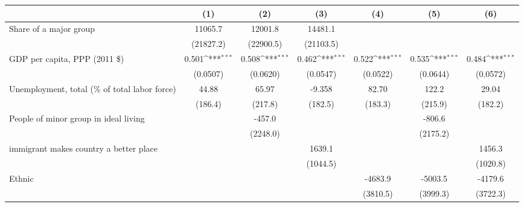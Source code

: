 {
\def\sym#1{\ifmmode^{#1}\else\(^{#1}\)\fi}
\begin{tabular}{l*{6}{c}}
\hline\hline
                    &\multicolumn{1}{c}{(1)}&\multicolumn{1}{c}{(2)}&\multicolumn{1}{c}{(3)}&\multicolumn{1}{c}{(4)}&\multicolumn{1}{c}{(5)}&\multicolumn{1}{c}{(6)}\\
\hline
Share of a major group&     11065.7         &     12001.8         &     14481.1         &                     &                     &                     \\
                    &   (21827.2)         &   (22900.5)         &   (21103.5)         &                     &                     &                     \\
[1em]
GDP per capita, PPP (2011 \$)&       0.501\sym{***}&       0.508\sym{***}&       0.462\sym{***}&       0.522\sym{***}&       0.535\sym{***}&       0.484\sym{***}\\
                    &    (0.0507)         &    (0.0620)         &    (0.0547)         &    (0.0522)         &    (0.0644)         &    (0.0572)         \\
[1em]
Unemployment, total (\% of total labor force)&       44.88         &       65.97         &      -9.358         &       82.70         &       122.2         &       29.04         \\
                    &     (186.4)         &     (217.8)         &     (182.5)         &     (183.3)         &     (215.9)         &     (182.2)         \\
[1em]
People of minor group in ideal living&                     &      -457.0         &                     &                     &      -806.6         &                     \\
                    &                     &    (2248.0)         &                     &                     &    (2175.2)         &                     \\
[1em]
immigrant makes country a better place&                     &                     &      1639.1         &                     &                     &      1456.3         \\
                    &                     &                     &    (1044.5)         &                     &                     &    (1020.8)         \\
[1em]
Ethnic              &                     &                     &                     &     -4683.9         &     -5003.5         &     -4179.6         \\
                    &                     &                     &                     &    (3810.5)         &    (3999.3)         &    (3722.3)         \\

\end{tabular}}
